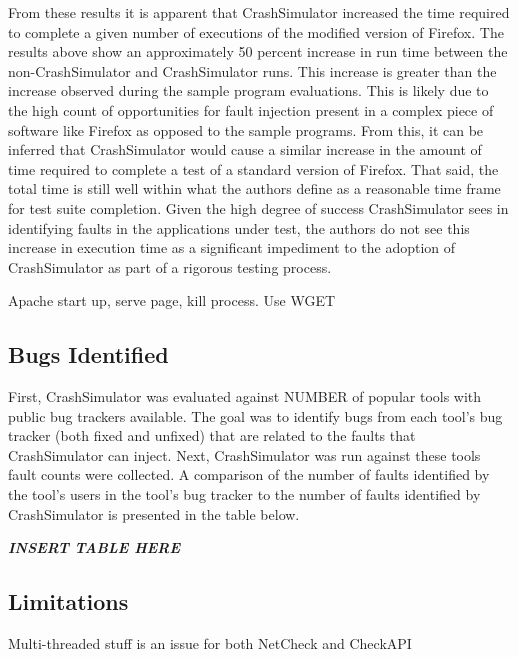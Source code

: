                 From these results it is apparent that CrashSimulator  increased the time required to complete a given
                number of executions of the modified version of Firefox. The results above show an approximately 50
                percent increase in run time between the non-CrashSimulator and CrashSimulator runs. This increase is
                greater than the increase observed during the sample program evaluations. This is likely due to the high
                count of opportunities for fault injection present in a complex piece of software like Firefox as
                opposed to the sample programs. From this, it can be inferred that CrashSimulator would cause a similar
                increase in the amount of time required to complete a test of a standard version of Firefox. That said,
                the total time is still well within what the authors define as a reasonable time frame for test suite
                completion. Given the high degree of success CrashSimulator sees in identifying faults in the
                applications under test, the authors do not see this increase in execution time as a significant
                impediment to the adoption of CrashSimulator as part of a rigorous testing process.

        Apache start up, serve page, kill process. Use WGET

    \subsection{Bugs Identified}

    First, CrashSimulator was evaluated against NUMBER of popular tools with public bug trackers available. The goal was
    to identify bugs from each tool's bug tracker (both fixed and unfixed) that are related to the faults that
    CrashSimulator can inject. Next, CrashSimulator was run against these tools fault counts were collected. A
    comparison of the number of faults identified by the tool's users in the tool's bug tracker to the number of faults
    identified by CrashSimulator is presented in the table below.

    \emph{\textbf{INSERT TABLE HERE}}

    \subsection{Limitations}

        Multi-threaded stuff is an issue for both NetCheck and CheckAPI


